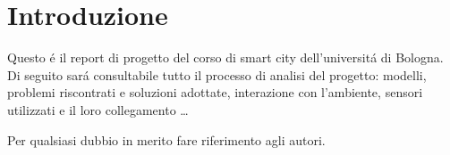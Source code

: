 \section{Introduzione}

Questo \'e il report di progetto del corso di smart city dell'universit\'a di Bologna. Di seguito sar\'a consultabile tutto il processo di analisi del progetto: modelli, problemi riscontrati e soluzioni adottate, interazione con l'ambiente, sensori utilizzati e il loro collegamento \ldots

Per qualsiasi dubbio in merito fare riferimento agli autori.
